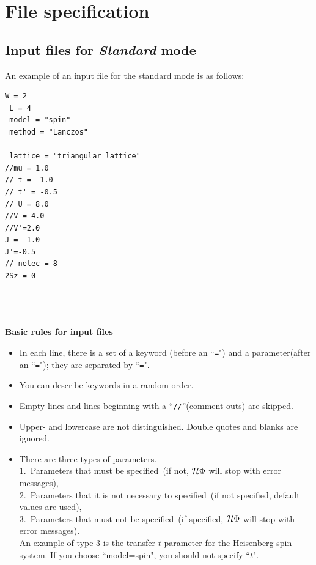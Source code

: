 \chapter{File specification}
\label{Ch:HowToStandard}
\section{Input files for {\it Standard} mode}

An example of an input file for the standard mode is as follows:

\begin{minipage}{10cm}
\begin{screen}
\begin{verbatim}
W = 2
 L = 4
 model = "spin"
 method = "Lanczos"

 lattice = "triangular lattice"
//mu = 1.0
// t = -1.0
// t' = -0.5
// U = 8.0
//V = 4.0
//V'=2.0
J = -1.0
J'=-0.5
// nelec = 8
2Sz = 0
\end{verbatim}
\end{screen}
\end{minipage}
~\\
~\\
~\\
{\bf Basic rules for input files}
\begin{itemize}
\item In each line, there is a set of a keyword (before an ``\verb|=|") and a parameter(after an ``\verb|=|"); 
  they are separated by ``\verb|=|".
\item You can describe keywords in a random order.
\item Empty lines and lines beginning with a ``\verb|//|''(comment outs) are skipped.
\item Upper- and lowercase are not distinguished.
  Double quotes and blanks are ignored.
\item There are three types of parameters.\\ 
  1.~Parameters that must be specified~(if not, $\mathcal{H} \Phi$ will stop with error messages),\\ 
  2.~Parameters that it is not necessary to specified~(if not specified, default values are used),\\
  3.~Parameters that must not be specified~(if specified, $\mathcal{H} \Phi$ will stop with error messages).\\
  An example of type 3 is the transfer $t$ parameter for the Heisenberg spin system. 
  If you choose ``model=spin", you should not specify ``$t$".
\end{itemize}

